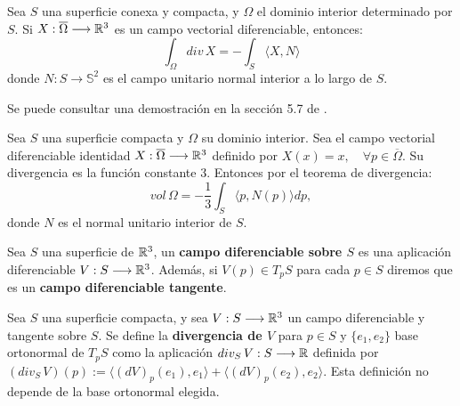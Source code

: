 \begin{theorem}\label{divergencetheorem}
Sea $S$ una superficie conexa y compacta, y $\Omega$ el dominio interior determinado por $S$. Si $X: \overline{\Omega} \longrightarrow \mathbb{R}^3$ es un campo vectorial diferenciable, entonces:
%
\begin{equation*}
    \int_\Omega div \, X = -\int_S  \langle X,N \rangle
\end{equation*}
%
donde $N: S \longrightarrow \mathbb{S}^2$ es el campo unitario normal interior a lo largo de $S$.
\end{theorem}

Se puede consultar una demostración en la sección 5.7 de \cite{montielrosbook}.

\begin{definition}\label{volumensuperficiecompacta}
Sea $S$ una superficie compacta y $\Omega$ su dominio interior. Sea el campo vectorial diferenciable identidad $X: \overline{\Omega} \longrightarrow \mathbb{R}^3$ definido por $X(x) = x, \quad \forall p \in \overline{\Omega}$. Su divergencia es la función constante 3. Entonces por el teorema de divergencia:
%
\begin{equation*}
    vol \, \Omega = - \frac{1}{3} \int_S  \langle p, N(p) \rangle  dp,
\end{equation*}
%
donde $N$ es el normal unitario interior de $S$.
\end{definition}

\begin{definition}
    Sea $S$ una superficie de $\mathbb{R}^3$, un \textbf{campo diferenciable sobre $S$} es una aplicación diferenciable $V: S \longrightarrow \mathbb{R}^3$. Además, si $V(p) \in T_pS$ para cada $p \in S$ diremos que es un \textbf{campo diferenciable tangente}.
\end{definition}

\begin{definition}
    Sea $S$ una superficie compacta, y sea $V: S \longrightarrow \mathbb{R}^3$ un campo diferenciable y tangente sobre $S$. Se define la \textbf{divergencia de $V$} para $p \in S$ y $\{e_1,e_2\}$ base ortonormal de $T_pS$ como la aplicación $div_S \, V: S \longrightarrow \mathbb{R}$ definida por $(div_S \, V)(p) := \langle (dV)_p(e_1),e_1 \rangle + \langle (dV)_p(e_2),e_2 \rangle$. Esta definición no depende de la base ortonormal elegida.
\end{definition}

